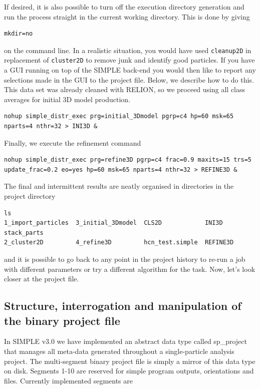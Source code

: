 \documentclass[a4paper,11pt]{article}
\newcommand{\prgname}[1]{\textcolor{NavyBlue}{\texttt{#1}}}
\begin{document}
\noindent{}If desired, it is also possible to turn off the execution directory generation and run the process straight in the current working directory. This is done by giving

\begin{Verbatim}[commandchars=+\[\],fontsize=\small,breaklines=true]
mkdir=no
\end{Verbatim}

\noindent{}on the command line. In a realistic situation, you would have used \prgname{cleanup2D} in replacement of \prgname{cluster2D} to remove junk and identify good particles. If you have a GUI running on top of the SIMPLE back-end you would then like to report any selections made in the GUI to the project file. Below, we describe how to do this. This data set was already cleaned with RELION, so we proceed using all class averages for initial 3D model production.

\begin{Verbatim}[commandchars=+\[\],fontsize=\small,breaklines=true]
nohup simple_distr_exec prg=initial_3Dmodel pgrp=c4 hp=60 msk=65 nparts=4 nthr=32 > INI3D &
\end{Verbatim}

\noindent{}Finally, we execute the refinement command

\begin{Verbatim}[commandchars=+\[\],fontsize=\small,breaklines=true]
nohup simple_distr_exec prg=refine3D pgrp=c4 frac=0.9 maxits=15 trs=5 update_frac=0.2 eo=yes hp=60 msk=65 nparts=4 nthr=32 > REFINE3D &
\end{Verbatim}

\noindent{}The final and intermittent results are neatly organised in directories in the project directory

\begin{Verbatim}[commandchars=+\[\],fontsize=\small,breaklines=true]
ls
1_import_particles  3_initial_3Dmodel  CLS2D            INI3D     stack_parts
2_cluster2D         4_refine3D         hcn_test.simple  REFINE3D
\end{Verbatim}

\noindent{}and it is possible to go back to any point in the project history to re-run a job with different parameters or try a different algorithm for the task. Now, let's look closer at the project file.

\subsection{Structure, interrogation and manipulation of the binary project file}
In SIMPLE v3.0 we have implemented an abstract data type called sp\_project that manages all meta-data generated throughout a single-particle analysis project. The multi-segment binary project file is simply a mirror of this data type on disk. Segments 1-10 are reserved  for simple program outputs, orientations and files. Currently implemented segments are
\end{document}
